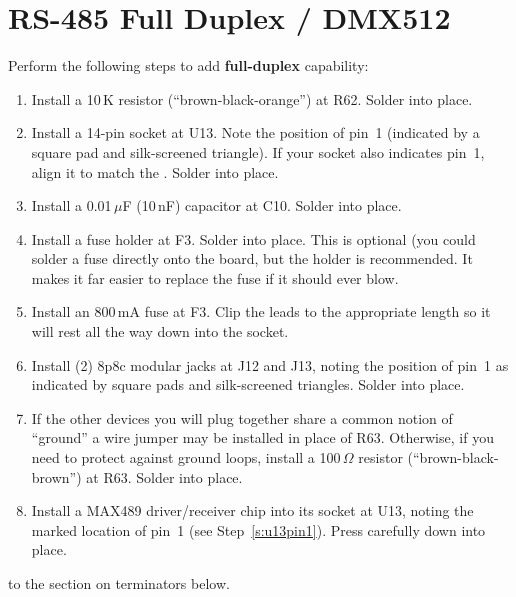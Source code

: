 \documentclass[letterpaper,twoside,onecolumn,openright,final]{memoir}
\begin{document}
\section{RS-485 Full Duplex / DMX512}
Perform the following steps to add {\bfseries full-duplex}  capability:
\begin{enumerate}
\item	Install a 10\,K resistor (``brown-black-orange'') at R62.  Solder into place.
\item\label{s:u13pin1}
	Install a 14-pin  socket at U13.  Note the position of pin~1 (indicated
	by a square pad and silk-screened triangle).  If your socket also indicates pin~1, align
	it to match the . Solder into place.
\item	Install a 0.01\,$\mu$F (10\,nF) capacitor at C10. Solder into place.
\item	Install a fuse holder at F3.  Solder into place.  This is optional (you could solder a fuse
	directly onto the board, but the holder is recommended.  It makes it far easier to replace
	the fuse if it should ever blow.
\item	Install an 800\,mA fuse at F3.  Clip the leads to the appropriate length so it will rest
	all the way down into the socket.
\item	Install (2) 8p8c modular jacks at J12 and J13, noting the position of pin~1 as indicated by
	square pads and silk-screened triangles.  Solder into place.
\item	If the other devices you will plug together share a common notion of ``ground'' a wire jumper
	may be installed in place of R63.  Otherwise, if you need to protect against ground loops,
	install a 100\,$\Omega$ resistor (``brown-black-brown'') at R63. Solder into place.
\item	Install a MAX489 driver/receiver chip into its socket at U13, noting the marked location
	of pin~1 (see Step~\ref{s:u13pin1}).  Press carefully down into place.
\end{enumerate}

\bigskip{} to the section on  terminators below.
\end{document}
